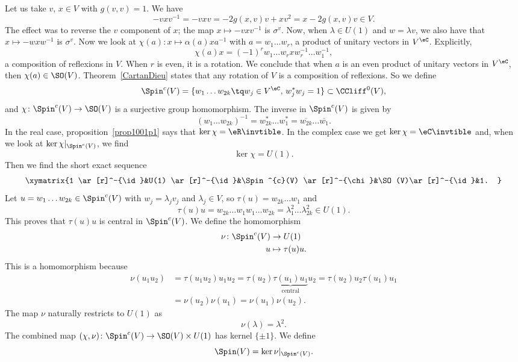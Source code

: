 Let us take $v$, $x\in V$ with $g(v,v)=1$. We have
\[
  -vxv^{-1}=-vxv=-2g(x,v)v+xv^2
		=x-2g(x,v)v\in V.
\]
The effect was to reverse the $v$ component of $x$; the map $x\mapsto -vxv^{-1}$ is $\sigma^v$. Now, when $\lambda\in U(1)$ and $w=\lambda v$, we also have that $x\mapsto -wxw^{-1}$ is $\sigma^v$. Now we look at $\chi(a)\colon x\mapsto \alpha(a)xa^{-1}$ with $a=w_{1}\ldots w_{r}$, a product of unitary vectors in $V^{\eC}$. Explicitly,
\[
  \chi(a)x=(-1)^{r} w_{1}\ldots w_{r}xw_{r}^{-1}\ldots w_{1}^{-1},
\]
a composition of reflexions in $V$. When $r$ is even, it is a rotation. We conclude that when $a$ is an even product of unitary vectors in $V^{\eC}$, then $\chi(a)\in \SO(V)$. Theorem~\ref{CartanDieu} states that any rotation of $V$ is a composition of reflexions. So we define
\begin{equation}
\Spin^{c}(V)=\{ w_{1}\ldots w_{2k}\tq w_{j}\in V^{\eC},\,w_{j}^*w_{j}=1 \}\subset \CCliff^{0}(V),
\end{equation}
and $\chi\colon \Spin^{c}(V)\to \SO(V)$ is a surjective group homomorphism. The inverse in $\Spin^{c}(V)$ is given by
\[
  (w_{1}\ldots w_{2k})^{-1}=w_{2k}^*\ldots w_{1}^*=\overline{ w_{2k} }\ldots\overline{ w_{1} }.
\]
In the real case, proposition~\ref{prop1001p1} says that $\ker\chi=\eR\invtible$. In the complex case we get  $\ker\chi=\eC\invtible$ and, when we look at $\ker\chi|_{\Spin^{c}(V)}$, we find
\begin{equation}
\ker\chi=U(1).
\end{equation}
Then we find the short exact sequence
\begin{equation}
\xymatrix{%
   1 \ar[r]^-{\id}&U(1) \ar[r]^-{\id}&\Spin^{c}(V) \ar[r]^-{\chi}&\SO(V)\ar[r]^-{\id}&1.
}
\end{equation}
Let $u=w_{1}\ldots w_{2k}\in\Spin^{c}(V)$ with $w_{j}=\lambda_{j}v_{j}$ and $\lambda_{j}\in V$, so $\tau(u)=w_{2k}\ldots w_{1}$ and
\[
  \tau(u)u=w_{2k}\ldots w_{1}w_{1}\ldots w_{2k}
		=\lambda_{1}^{2}\ldots \lambda_{2k}^{2}\in U(1).
\]
This proves that $\tau(u)u$ is central in $\Spin^{c}(V)$. We define the homomorphism
\begin{equation}
\begin{aligned}
\nu \colon \Spin^{c}(V)&\to U(1) \\
u&\mapsto \tau(u)u.
\end{aligned}
\end{equation}
This is a homomorphism because
\[
\begin{split}
  \nu(u_{1}u_{2})&=\tau(u_{1}u_{2})u_{1}u_{2}
		=\tau(u_{2})\underbrace{\tau(u_{1})u_{1}}_{\text{central}}u_{2}
		=\tau(u_{2})u_{2}\tau(u_{1})u_{1}\\
		&=\nu(u_{2})\nu(u_{1})
		=\nu(u_{1})\nu(u_{2}).
\end{split}
\]
The map $\nu$ naturally restricts to $U(1)$ as
\[
  \nu(\lambda)=\lambda^{2}.
\]
The combined map $(\chi,\nu)\colon \Spin^{c}(V)\to \SO(V)\times U(1)$ has kernel $\{ \pm 1 \}$. We define
\begin{equation}  \label{eq_defSpindeux}
\Spin(V)=\ker\nu|_{\Spin^{c}(V)}.
\end{equation}

